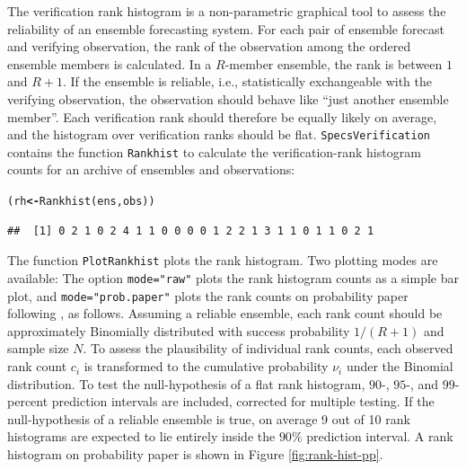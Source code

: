 \documentclass[10pt]{article}\usepackage[]{graphicx}\usepackage[]{color}
\makeatletter
\newcommand{\hlstd}[1]{\textcolor[rgb]{0,0,0}{#1}}%
\newcommand{\hlkwb}[1]{\textcolor[rgb]{0.502,0.502,0.753}{\textbf{#1}}}%
\newcommand{\hlkwd}[1]{\textcolor[rgb]{0,0.267,0.4}{#1}}%
\newenvironment{kframe}{%
 \def\at@end@of@kframe{}%
 \ifinner\ifhmode%
  \def\at@end@of@kframe{\end{minipage}}%
  \begin{minipage}{\columnwidth}%
 \fi\fi%
 \def\FrameCommand##1{\hskip\@totalleftmargin \hskip-\fboxsep
 \colorbox{shadecolor}{##1}\hskip-\fboxsep
     \hskip-\linewidth \hskip-\@totalleftmargin \hskip\columnwidth}%
 \MakeFramed {\advance\hsize-\width
   \@totalleftmargin\z@ \linewidth\hsize
   \@setminipage}}%
 {\par\unskip\endMakeFramed%
 \at@end@of@kframe}
\newenvironment{knitrout}{}{} %
\newcommand{\pkg}[1]{\texttt{#1}}
\newcommand{\code}[1]{\texttt{#1}}
\makeatother
\begin{document}
The verification rank histogram \citep{talagrand1997evaluation,hamill2001interpretation} is a non-parametric graphical tool to assess the reliability of an ensemble forecasting system.
For each pair of ensemble forecast and verifying observation, the rank of the observation among the ordered ensemble members is calculated.
In a $R$-member ensemble, the rank is between $1$ and $R+1$.
If the ensemble is reliable, i.e., statistically exchangeable with the verifying observation, the observation should behave like ``just another ensemble member''. 
Each verification rank should therefore be equally likely on average, and the histogram over verification ranks should be flat. 
\pkg{SpecsVerification} contains the function \code{Rankhist} to calculate the verification-rank histogram counts for an archive of ensembles and observations:
%
\begin{knitrout}
\color{fgcolor}\begin{kframe}
\begin{alltt}
\hlstd{(rh} \hlkwb{<-} \hlkwd{Rankhist}\hlstd{(ens, obs))}
\end{alltt}
\begin{verbatim}
##  [1] 0 2 1 0 2 4 1 1 0 0 0 0 1 2 2 1 3 1 1 0 1 1 0 2 1
\end{verbatim}
\end{kframe}
\end{knitrout}


The function \code{PlotRankhist} plots the rank histogram.
Two plotting modes are available:
The option \code{mode="raw"} plots the rank histogram counts as a simple bar plot, and \code{mode="prob.paper"} plots the rank counts on probability paper following \citet{broecker2008reliability}, as follows.
Assuming a reliable ensemble, each rank count should be approximately Binomially distributed with success probability $1/(R+1)$ and sample size $N$.
To assess the plausibility of individual rank counts, each observed rank count $c_i$ is transformed to the cumulative probability $\nu_i$ under the Binomial distribution.
To test the null-hypothesis of a flat rank histogram, $90$-, $95$-, and $99$-percent prediction intervals are included, corrected for multiple testing.
If the null-hypothesis of a reliable ensemble is true, on average 9 out of 10 rank histograms are expected to lie entirely inside the $90\%$ prediction interval.
A rank histogram on probability paper is shown in Figure \ref{fig:rank-hist-pp}. 
\end{document}
